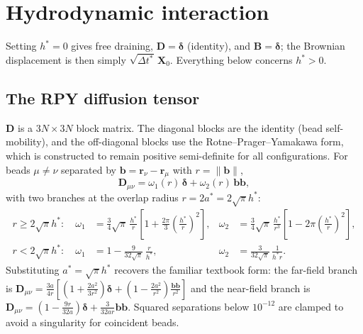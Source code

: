 \documentclass[11pt,a4paper]{report}
\newcommand{\D}{\bm{D}}
\newcommand{\B}{\bm{B}}
\newcommand{\dt}{\Delta t^{*}}
\begin{document}
\chapter{Hydrodynamic interaction}
\label{ch:hi}

Setting $h^{*} = 0$ gives free draining, $\D = \bm{\delta}$ (identity), and
$\B = \bm{\delta}$; the Brownian displacement is then simply
$\sqrt{\dt}\,\bm{X}_0$. Everything below concerns $h^{*} > 0$.

\section{The RPY diffusion tensor}
\label{sec:rpy}

$\D$ is a $3N\times3N$ block matrix. The diagonal blocks are the identity (bead
self-mobility), and the off-diagonal blocks use the Rotne--Prager--Yamakawa form,
which is constructed to remain positive semi-definite for all configurations.
For beads $\mu\ne\nu$ separated by $\bm{b} = \bm{r}_\nu - \bm{r}_\mu$ with
$r = \|\bm{b}\|$,
\begin{equation}
  \D_{\mu\nu} = \omega_1(r)\,\bm{\delta} + \omega_2(r)\,\bm{b}\bm{b},
  \label{eq:rpy-block}
\end{equation}
with two branches at the overlap radius $r = 2a^{*} = 2\sqrt{\pi}h^{*}$:
\begin{equation}
  \boxed{
  \begin{aligned}
    r \ge 2\sqrt{\pi}h^{*}:\quad
      \omega_1 &= \tfrac{3}{4}\sqrt{\pi}\,\frac{h^{*}}{r}
                  \left[1 + \tfrac{2\pi}{3}\left(\tfrac{h^{*}}{r}\right)^{2}\right], &
      \omega_2 &= \tfrac{3}{4}\sqrt{\pi}\,\frac{h^{*}}{r^{3}}
                  \left[1 - 2\pi\left(\tfrac{h^{*}}{r}\right)^{2}\right],\\[0.5em]
    r < 2\sqrt{\pi}h^{*}:\quad
      \omega_1 &= 1 - \frac{9}{32\sqrt{\pi}}\,\frac{r}{h^{*}}, &
      \omega_2 &= \frac{3}{32\sqrt{\pi}}\,\frac{1}{h^{*} r} .
  \end{aligned}}
  \label{eq:rpy-omegas}
\end{equation}
Substituting $a^{*} = \sqrt{\pi}h^{*}$ recovers the familiar textbook form: the
far-field branch is
$\D_{\mu\nu} = \tfrac{3a}{4r}\left[\left(1+\tfrac{2a^{2}}{3r^{2}}\right)\bm{\delta}
 + \left(1-\tfrac{2a^{2}}{r^{2}}\right)\tfrac{\bm{b}\bm{b}}{r^{2}}\right]$
and the near-field branch is
$\D_{\mu\nu} = \left(1-\tfrac{9r}{32a}\right)\bm{\delta} + \tfrac{3}{32ar}\bm{b}\bm{b}$.
Squared separations below $10^{-12}$ are clamped to avoid a singularity for
coincident beads.
\end{document}
